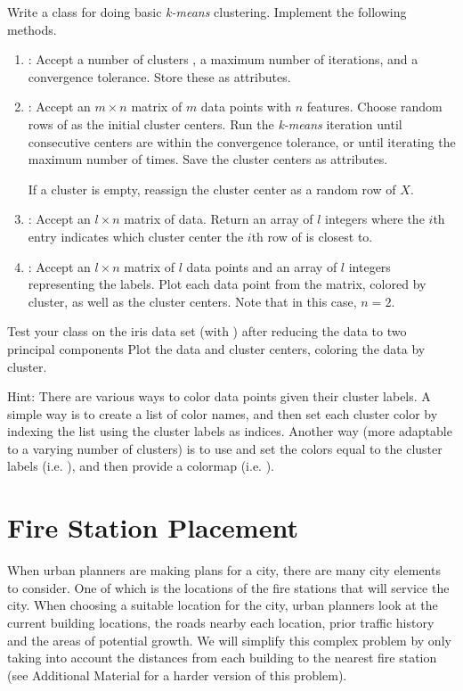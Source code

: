 \begin{problem}
Write a  class for doing basic \emph{k-means} clustering.
Implement the following methods.
\begin{enumerate}
\item {}: Accept a number of clusters , a maximum number of iterations, and a convergence tolerance.
Store these as attributes.

\item {}: Accept an $m \times n$ matrix  of $m$ data points with $n$ features.
Choose  random rows of  as the initial cluster centers.
Run the \emph{k-means} iteration until consecutive centers are within the convergence tolerance, or until iterating the maximum number of times.
Save the cluster centers as attributes.

If a cluster is empty, reassign the cluster center as a random row of $X$.

\item {}: Accept an $l \times n$ matrix  of data.
Return an array of $l$ integers where the $i$th entry indicates which cluster center the $i$th row of  is closest to.

\item {}: Accept an $l \times n$ matrix  of $l$ data points and an array  of $l$ integers representing the labels.
Plot each data point from the matrix, colored by cluster, as well as the cluster centers.
Note that in this case, $n = 2$.
\end{enumerate}
%
Test your class on the iris data set (with ) after reducing the data to two principal components
Plot the data and cluster centers, coloring the data by cluster.

Hint: There are various ways to color data points given their cluster labels.
A simple way is to create a list of color names, and then set each cluster color by indexing the list using the cluster labels as indices.
Another way (more adaptable to a varying number of clusters) is to use  and set the colors  equal to the cluster labels  (i.e. ), and then provide a colormap (i.e. ).
\label{eq:prob1}
\end{problem}

\section*{Fire Station Placement} %
When urban planners are making plans for a city, there are many city elements to consider.
One of which is the locations of the fire stations that will service the city.
When choosing a suitable location for the city, urban planners look at the current building locations, the roads nearby each location, prior traffic history and the areas of potential growth.
We will simplify this complex problem by only taking into account the distances from each building to the nearest fire station (see Additional Material for a harder version of this problem).

